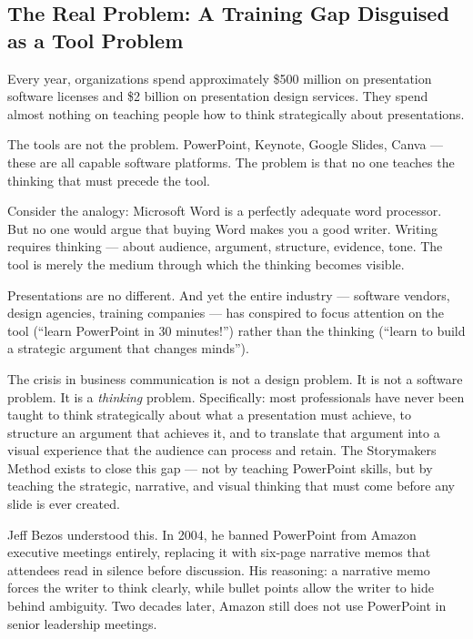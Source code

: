 \subsection{The Real Problem: A Training Gap Disguised as a Tool Problem}

Every year, organizations spend approximately \$500 million on presentation software licenses and \$2 billion on presentation design services. They spend almost nothing on teaching people how to think strategically about presentations.

The tools are not the problem. PowerPoint, Keynote, Google Slides, Canva --- these are all capable software platforms. The problem is that no one teaches the thinking that must precede the tool.

Consider the analogy: Microsoft Word is a perfectly adequate word processor. But no one would argue that buying Word makes you a good writer. Writing requires thinking --- about audience, argument, structure, evidence, tone. The tool is merely the medium through which the thinking becomes visible.

Presentations are no different. And yet the entire industry --- software vendors, design agencies, training companies --- has conspired to focus attention on the tool (``learn PowerPoint in 30 minutes!'') rather than the thinking (``learn to build a strategic argument that changes minds'').

\begin{thesisbox}
The crisis in business communication is not a design problem. It is not a software problem. It is a \emph{thinking} problem. Specifically: most professionals have never been taught to think strategically about what a presentation must achieve, to structure an argument that achieves it, and to translate that argument into a visual experience that the audience can process and retain. The Storymakers Method exists to close this gap --- not by teaching PowerPoint skills, but by teaching the strategic, narrative, and visual thinking that must come before any slide is ever created.
\end{thesisbox}

Jeff Bezos understood this. In 2004, he banned PowerPoint from Amazon executive meetings entirely, replacing it with six-page narrative memos that attendees read in silence before discussion. His reasoning: a narrative memo forces the writer to think clearly, while bullet points allow the writer to hide behind ambiguity. Two decades later, Amazon still does not use PowerPoint in senior leadership meetings.

